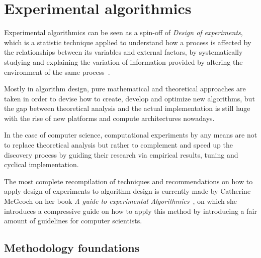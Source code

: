 \section{Experimental algorithmics}
Experimental algorithmics can be seen as a spin-off of \textit{Design of experiments}, which is a statistic technique applied to understand how a process is affected by the relationships between its variables and external factors, by systematically studying and explaining the variation of information provided by altering the environment of the same process~\cite{Wagner_Mount_Giles_2014}.

Mostly in algorithm design, pure mathematical and theoretical approaches are taken in order to devise how to create, develop and optimize new algorithms, but the gap between theoretical analysis and the actual implementation is still huge with the rise of new platforms and compute architectures nowadays.

In the case of computer science, computational experiments by any means are not to replace theoretical analysis but rather to complement and speed up the discovery process by guiding their research via empirical results, tuning and cyclical implementation.

The most complete recompilation of techniques and recommendations on how to apply design of experiments to algorithm design is currently made by Catherine McGeoch on her book \textit{A guide to experimental Algorithmics}~\cite{10.5555/2159557}, on which she introduces a compressive guide on how to apply this method by introducing a fair amount of guidelines for computer scientists.

\subsection{Methodology foundations}

